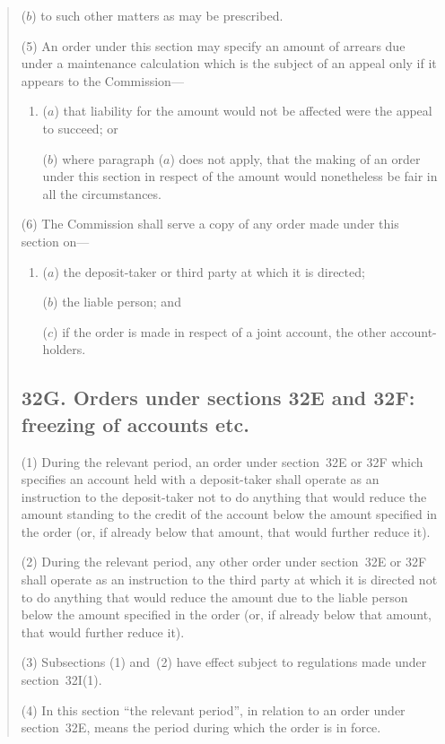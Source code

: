 \documentclass[12pt,a4paper]{article}
\begin{document}
\begin{quotation}
\begin{enumerate}
($b$) to such other matters as may be prescribed.
\end{enumerate}

(5)
An order under this section may specify an amount of arrears due under a maintenance calculation which is the subject of an appeal only if it appears to the Commission---
\begin{enumerate}\item[]
($a$) that liability for the amount would not be affected were the appeal to succeed; or

($b$) where paragraph ($a$) does not apply, that the making of an order under this section in respect of the amount would nonetheless be fair in all the circumstances.
\end{enumerate}

(6) The Commission shall serve a copy of any order made under this section on---
\begin{enumerate}\item[]
($a$) the deposit-taker or third party at which it is directed;

($b$) the liable person; and

($c$) if the order is made in respect of a joint account, the other account-holders.
\end{enumerate}

\subsection*{32G. Orders under sections 32E and 32F: freezing of accounts etc.}

(1) During the relevant period, an order under section~32E or 32F which
specifies an account held with a deposit-taker shall operate as an instruction to the deposit-taker not to do anything that would reduce the amount standing to the credit of the account below the amount specified in the order (or, if already below that amount, that would further reduce it).

(2)
During the relevant period, any other order under section~32E or 32F shall operate as an instruction to the third party at which it is directed not to do anything that would reduce the amount due to the liable person below the amount specified in the order (or, if already below that amount, that would further reduce it).

(3)
Subsections (1) and~(2) have effect subject to regulations made under section~32I(1).

(4)
In this section “the relevant period”, in relation to an order under section~32E, means the period during which the order is in force.


\end{quotation}
\end{document}
